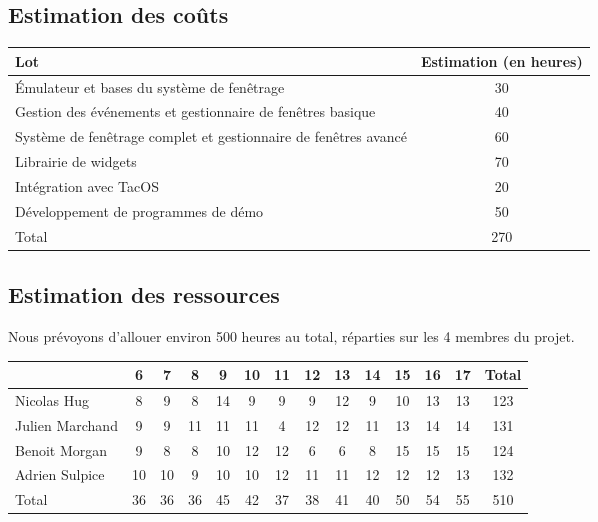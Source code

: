 \subsection{Estimation des coûts}

\begin{tabular}{|l|c|}
  \hline
  Lot & Estimation (en heures) \\
  \hline
  Émulateur et bases du système de fenêtrage & 30 \\
  \hline
  Gestion des événements et gestionnaire de fenêtres basique & 40 \\
  \hline
  Système de fenêtrage complet et gestionnaire de fenêtres avancé & 60 \\
  \hline
  Librairie de widgets  & 70 \\
  \hline
  Intégration avec TacOS & 20 \\
  \hline
  Développement de programmes de démo & 50 \\
  \hline
  Total & 270 \\
  \hline
\end{tabular}

\subsection{Estimation des ressources}

Nous prévoyons d'allouer environ 500 heures au total, réparties sur les 4 membres du projet.

\begin{tabular}{|l|c|c|c|c|c|c|c|c|c|c|c|c|c|}
  \hline
                    &   6   &   7   &   8   &   9     &   10  &   11  &   12  &   13    &   14  &   15    &   16    &   17    &  Total \\
  \hline
  Nicolas Hug       &   8   &   9   &   8   &   14    &   9   &   9   &   9   &   12    &   9   &   10    &   13    &   13    &   123 \\
  \hline
  Julien Marchand   &   9   &   9   &   11  &   11    &   11  &   4   &   12  &   12    &   11  &   13    &   14    &   14    &   131 \\
  \hline
  Benoit Morgan     &   9   &   8   &   8   &   10    &   12  &   12  &   6   &   6     &   8   &   15    &   15    &   15    &   124 \\
  \hline
  Adrien Sulpice    &   10  &   10  &   9   &   10    &   10  &   12  &   11  &   11    &   12  &   12    &   12    &   13    &   132 \\
  \hline
  Total             &   36  &   36  &   36  &   45    &   42  &   37  &   38  &   41    &   40  &   50    &   54    &   55    &   510  \\
  \hline
\end{tabular}

